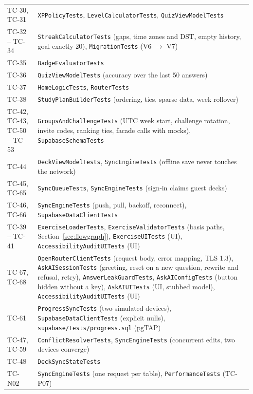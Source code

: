 \documentclass[12pt,letterpaper]{article}
\begin{document}
\begin{xltabular}{\textwidth}{@{}L{2.4cm} Y@{}}
TC-30, TC-31 & \texttt{XPPolicyTests}, \texttt{LevelCalculatorTests}, \texttt{QuizViewModelTests} \\
TC-32 -- TC-34 & \texttt{StreakCalculatorTests} (gaps, time zones and DST, empty history, goal exactly 20), \texttt{MigrationTests} (V6 $\to$ V7) \\
TC-35 & \texttt{BadgeEvaluatorTests} \\
TC-36 & \texttt{QuizViewModelTests} (accuracy over the last 50 answers) \\
TC-37 & \texttt{HomeLogicTests}, \texttt{RouterTests} \\
TC-38 & \texttt{StudyPlanBuilderTests} (ordering, ties, sparse data, week rollover) \\
TC-42, TC-43, TC-50 -- TC-53 & \texttt{GroupsAndChallengeTests} (UTC week start, challenge rotation, invite codes, ranking ties, facade calls with mocks), \texttt{SupabaseSchemaTests} \\
TC-44 & \texttt{DeckViewModelTests}, \texttt{SyncEngineTests} (offline save never touches the network) \\
TC-45, TC-65 & \texttt{SyncQueueTests}, \texttt{SyncEngineTests} (sign-in claims guest decks) \\
TC-46, TC-66 & \texttt{SyncEngineTests} (push, pull, backoff, reconnect), \texttt{SupabaseDataClientTests} \\
TC-39 -- TC-41 & \texttt{ExerciseLoaderTests}, \texttt{ExerciseValidatorTests} (basis paths, Section~\ref{sec:flowgraph}), \texttt{ExerciseUITests} (UI), \texttt{AccessibilityAuditUITests} (UI) \\
TC-67, TC-68 & \texttt{OpenRouterClientTests} (request body, error mapping, TLS 1.3), \texttt{AskAISessionTests} (greeting, reset on a new question, rewrite and refusal, retry), \texttt{AnswerLeakGuardTests}, \texttt{AskAIConfigTests} (button hidden without a key), \texttt{AskAIUITests} (UI, stubbed model), \texttt{AccessibilityAuditUITests} (UI) \\
TC-61 & \texttt{ProgressSyncTests} (two simulated devices), \texttt{SupabaseDataClientTests} (explicit nulls), \texttt{supabase/tests/progress.sql} (pgTAP) \\
TC-47, TC-59 & \texttt{ConflictResolverTests}, \texttt{SyncEngineTests} (concurrent edits, two devices converge) \\
TC-48 & \texttt{DeckSyncStateTests} \\
TC-N02 & \texttt{SyncEngineTests} (one request per table), \texttt{PerformanceTests} (TC-P07) \\

\end{xltabular}
\end{document}
